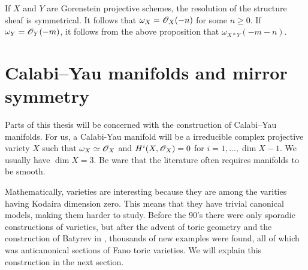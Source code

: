 \begin{remark}
\label{remark:canonical}
If $X$ and $Y$ are Gorenstein projective schemes, the resolution of the structure sheaf is symmetrical. It follows that $\omega_X=\mathscr{O}_X(-n)$ for some $n \geq 0$. If $\omega_Y=\mathscr{O}_Y(-m)$, it follows from the above proposition that $\omega_{X \ast Y}(-m-n)$.
\end{remark}

\section{Calabi--Yau manifolds and mirror symmetry} %
\label{sec:calabi_yau}

Parts of this thesis will be concerned with the construction of Calabi--Yau manifolds. For us, a Calabi-Yau manifold will be a irreducible complex projective variety $X$ such that $\omega_X \simeq \mathscr{O}_X$ and $H^i(X,\mathscr{O}_X)=0$ for $i=1,\ldots,\dim X-1$. We usually have $\dim X=3$. Be ware that the literature often requires \CY manifolds to be smooth.

Mathematically, \CY varieties are interesting because they are among the varities having Kodaira dimension zero. This means that they have trivial canonical models, making them harder to study. Before the 90's there were only sporadic constructions of \CY varieties, but after the advent of toric geometry and the construction of Batyrev in \cite{batyrev_mirrorsymmetry}, thousands of new examples were found, all of which was anticanonical sections of Fano toric varieties. We will explain this construction in the next section.

